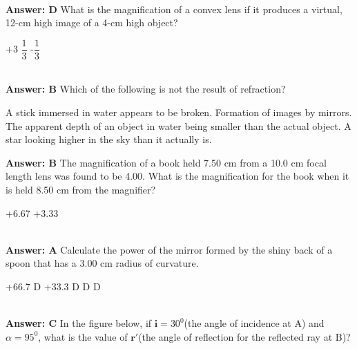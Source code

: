 \documentclass[12pt,addpoints]{exam}
\begin{document}
{{{\begin{questions}
					\begin{oneparchoices}
					\end{oneparchoices}	
					\\ \textbf{Answer: D}
					\question What is the magnification of a convex lens if it produces a virtual, 12-cm high image of a 4-cm high object?\\
					\begin{oneparchoices}
						\choice -3
						\choice +3
						\choice $\dfrac{1}{3}$
						\choice -$\dfrac{1}{3}$
					\end{oneparchoices}
					\\ \textbf{Answer: B} 
					\question Which of the following is not the result of refraction? 
					\begin{choices}
						\choice A stick immersed in water appears to be broken.
						\choice Formation of images by mirrors.
						\choice The apparent depth of an object in water being smaller than the actual object.
						\choice A star looking higher in the sky than it actually is.
					\end{choices}
					\textbf{Answer: B}
					\question  The magnification of a book held 7.50 cm from a 10.0 cm focal length lens was found to be 4.00. What is the magnification for the book when it is held 8.50 cm from the magnifier?\\ 
					\begin{oneparchoices}
						\choice +6.67
						\choice +3.33
						\choice -6.67
						.33
					\end{oneparchoices}
					\\ \textbf{Answer: A}	
					\question Calculate the power of the mirror formed by the shiny back of a spoon that has a 3.00 cm radius of curvature. \\
					\begin{oneparchoices}
						\choice +66.7 D
						\choice +33.3 D
						\choice -66.7 D
						\choice -33.3 D	
					\end{oneparchoices}
					\\ \textbf{Answer: C}
					\question In the figure below, if $\textbf{i}=30^0$(the angle of incidence at A) and $\alpha=95^0$, what is the value of $\textbf{r}'$(the angle of reflection for the reflected ray at B)?
					\begin{center}

\end{center}
\end{questions}}}}
\end{document}
